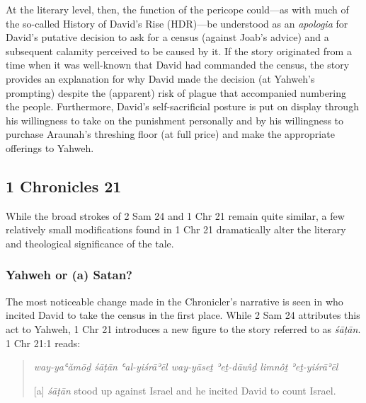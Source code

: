 At the literary level, then, the function of the pericope could---as
with much of the so-called History of David's Rise (HDR)---be understood
as an \emph{apologia} for David's putative decision to ask for a census
(against Joab's advice) and a subsequent calamity perceived to be caused
by it. If the story originated from a time when it was well-known that
David had commanded the census, the story provides an explanation for
why David made the decision (at Yahweh's prompting) despite the
(apparent) risk of plague that accompanied numbering the
people.\autocite[518]{mccarter1984} Furthermore, David's
self-sacrificial posture is put on display through his willingness to
take on the punishment personally and by his willingness to purchase
Araunah's threshing floor (at full price) and make the appropriate
offerings to Yahweh.

\subsection{1 Chronicles 21}\label{chronicles-21}

While the broad strokes of 2 Sam 24 and 1 Chr 21 remain quite similar, a
few relatively small modifications found in 1 Chr 21 dramatically alter
the literary and theological significance of the tale.

\subsubsection{Yahweh or (a) Satan?}\label{yahweh-or-a-satan}

The most noticeable change made in the Chronicler's narrative is seen in
who incited David to take the census in the first place. While 2 Sam 24
attributes this act to Yahweh, 1 Chr 21 introduces a new figure to the
story referred to as \emph{śāṭān}. 1 Chr 21:1 reads:

\begin{quote}
\emph{way-yaʿămōḏ śāṭān ʿal-yiśrāʾēl way-yāseṯ ʾeṯ-dāwı̂ḏ limnôṯ
ʾeṯ-yiśrāʾēl}

{[}a{]} \emph{śāṭān} stood up against Israel and he incited David to
count Israel.
\end{quote}

